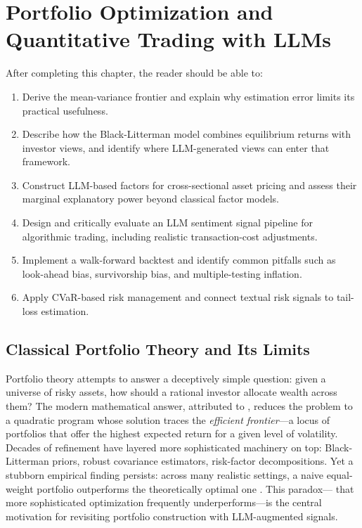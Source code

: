 \chapter{Portfolio Optimization and Quantitative Trading with LLMs}
\label{ch:portfolio-quant-trading}

\begin{remark}
After completing this chapter, the reader should be able to:
\begin{enumerate}
  \item Derive the mean-variance frontier and explain why estimation error
        limits its practical usefulness.
  \item Describe how the Black-Litterman model combines equilibrium returns with
        investor views, and identify where LLM-generated views can enter that framework.
  \item Construct LLM-based factors for cross-sectional asset pricing and assess their
        marginal explanatory power beyond classical factor models.
  \item Design and critically evaluate an LLM sentiment signal pipeline for
        algorithmic trading, including realistic transaction-cost adjustments.
  \item Implement a walk-forward backtest and identify common pitfalls such as
        look-ahead bias, survivorship bias, and multiple-testing inflation.
  \item Apply CVaR-based risk management and connect textual risk signals to
        tail-loss estimation.
\end{enumerate}
\end{remark}

\section{Classical Portfolio Theory and Its Limits}
\label{sec:ch10-classical-portfolio-theory}

Portfolio theory attempts to answer a deceptively simple question: given a universe of
risky assets, how should a rational investor allocate wealth across them? The modern
mathematical answer, attributed to \citet{markowitz1952portfolio}, reduces the problem to
a quadratic program whose solution traces the \emph{efficient frontier}---a locus of
portfolios that offer the highest expected return for a given level of volatility.
Decades of refinement have layered more sophisticated machinery on top: Black-Litterman
priors, robust covariance estimators, risk-factor decompositions. Yet a stubborn
empirical finding persists: across many realistic settings, a naive equal-weight portfolio
outperforms the theoretically optimal one \citep{demiguel2009optimal}. This paradox---
that more sophisticated optimization frequently underperforms---is the central motivation
for revisiting portfolio construction with LLM-augmented signals.

